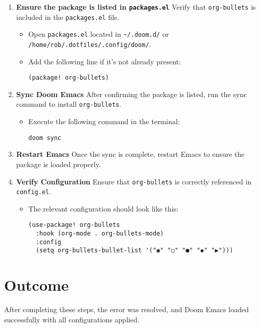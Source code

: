 \documentclass[11pt]{article}
\begin{document}
\begin{enumerate}
\item \textbf{\textbf{Ensure the package is listed in \texttt{packages.el}}}
Verify that \texttt{org-bullets} is included in the \texttt{packages.el} file.
\begin{itemize}
\item Open \texttt{packages.el} located in \texttt{\textasciitilde{}/.doom.d/} or \texttt{/home/rob/.dotfiles/.config/doom/}.
\item Add the following line if it's not already present:
\begin{verbatim}
(package! org-bullets)
\end{verbatim}
\end{itemize}

\item \textbf{\textbf{Sync Doom Emacs}}
After confirming the package is listed, run the sync command to install \texttt{org-bullets}.
\begin{itemize}
\item Execute the following command in the terminal:
\begin{verbatim}
doom sync
\end{verbatim}
\end{itemize}

\item \textbf{\textbf{Restart Emacs}}
Once the sync is complete, restart Emacs to ensure the package is loaded properly.

\item \textbf{\textbf{Verify Configuration}}
Ensure that \texttt{org-bullets} is correctly referenced in \texttt{config.el}.
\begin{itemize}
\item The relevant configuration should look like this:
\begin{verbatim}
(use-package! org-bullets
  :hook (org-mode . org-bullets-mode)
  :config
  (setq org-bullets-bullet-list '("◉" "○" "●" "◆" "▶")))
\end{verbatim}
\end{itemize}
\end{enumerate}

\section{Outcome}
\label{sec:org91c0c9a}
After completing these steps, the error was resolved, and Doom Emacs loaded successfully with all configurations applied.
\end{document}
